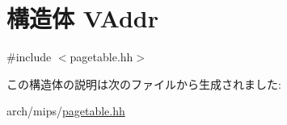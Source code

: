 \hypertarget{structMipsISA_1_1VAddr}{
\section{構造体 VAddr}
\label{structMipsISA_1_1VAddr}
}


{\ttfamily \#include $<$pagetable.hh$>$}

この構造体の説明は次のファイルから生成されました:\begin{DoxyCompactItemize}
\item 
arch/mips/\hyperlink{mips_2pagetable_8hh}{pagetable.hh}\end{DoxyCompactItemize}
